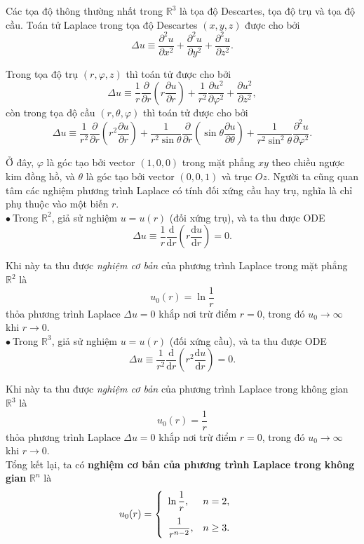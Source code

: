 \documentclass[10pt, a4paper]{article}
\begin{document}
	Các tọa độ thông thường nhất trong $\mathbb R^3$ là tọa độ Descartes, tọa độ trụ và tọa độ cầu. Toán tử Laplace trong tọa độ Descartes $(x,y,z)$ được cho bởi $$\Delta u\equiv\frac{\partial^2u}{\partial x^2}+\frac{\partial^2u}{\partial y^2}+\frac{\partial^2u}{\partial z^2}.$$
	
	Trong tọa độ trụ $(r,\varphi,z)$ thì toán tử được cho bởi $$\Delta u\equiv\frac 1r\frac{\partial}{\partial r}\left(r\frac{\partial u}{\partial r}\right)+\frac{1}{r^2}\frac{\partial u^2}{\partial\varphi^2}+\frac{\partial u^2}{\partial z^2},$$
	còn trong tọa độ cầu $(r,\theta,\varphi)$ thì toán tử được cho bởi $$\Delta u\equiv\frac 1{r^2}\frac{\partial}{\partial r}\left(r^2\frac{\partial u}{\partial r}\right)+\frac{1}{r^2\sin\theta}\frac{\partial}{\partial r}\left(\sin\theta\frac{\partial u}{\partial\theta}\right)+\frac{1}{r^2\sin^2\theta}\frac{\partial^2u}{\partial\varphi^2}.$$
	
	Ở đây, $\varphi$ là góc tạo bởi vector $(1,0,0)$ trong mặt phẳng $xy$ theo chiều ngược kim đồng hồ, và $\theta$ là góc tạo bởi vector $(0,0,1)$ và trục $Oz$. Người ta cũng quan tâm các nghiệm phương trình Laplace có tính đối xứng cầu hay trụ, nghĩa là chỉ phụ thuộc vào một biến $r$.\\
	
	$\bullet~$Trong $\mathbb R^2$, giả sử nghiệm $u=u(r)$ (đối xứng trụ), và ta thu được ODE $$\Delta u\equiv\frac 1r\frac{\mathrm d}{\mathrm dr}\left(r\frac{\mathrm du}{\mathrm dr}\right)=0.$$
	
	Khi này ta thu được \textit{nghiệm cơ bản} của phương trình Laplace trong mặt phẳng $\mathbb R^2$ là $$u_0(r)=\ln\frac 1r$$ thỏa phương trình Laplace $\Delta u=0$ khắp nơi trừ điểm $r=0$, trong đó $u_0\to\infty$ khi $r\to0$.\\
	
	$\bullet~$Trong $\mathbb R^3$, giả sử nghiệm $u=u(r)$ (đối xứng cầu), và ta thu được ODE $$\Delta u\equiv\frac{1}{r^2}\frac{\mathrm d}{\mathrm dr}\left(r^2\frac{\mathrm du}{\mathrm dr}\right)=0.$$
	
	Khi này ta thu được \textit{nghiệm cơ bản} của phương trình Laplace trong không gian $\mathbb R^3$ là $$u_0(r)=\frac 1r$$ thỏa phương trình Laplace $\Delta u=0$ khắp nơi trừ điểm $r=0$, trong đó $u_0\to\infty$ khi $r\to0$.\\
	
	Tổng kết lại, ta có \textbf{nghiệm cơ bản của phương trình Laplace trong không gian} $\mathbb R^n$ là $$u_0(r)=\begin{cases}
	\begin{array}{ll}
		\ln\dfrac1r, & n=2,\\
		\noalign{\vskip7pt}
		\dfrac{1}{r^{n-2}}, & n\ge3.
	\end{array}
	\end{cases}$$
	
\end{document}
